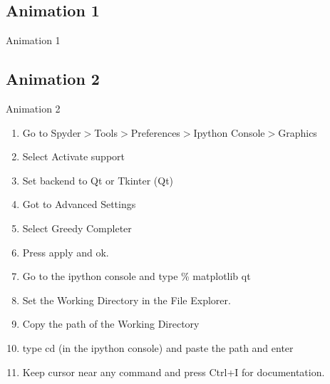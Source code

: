 \documentclass[handout]{beamer} %
\begin{document}
\subsection{Animation 1}
\begin{frame}{Animation 1}
	\only<2>{second}
	
	 \onslide<4>{fourth}
\end{frame}

\subsection{Animation 2}
\begin{frame}{Animation 2}
	\begin{enumerate}
		\item <+-|alert@+> Go to Spyder$>$Tools$>$Preferences$>$Ipython Console$>$Graphics
		\item  <+-|alert@+> Select Activate support
		\item  <+-|alert@+> {\color{red} Set backend to Qt or Tkinter (Qt)}
		\item  <+-|alert@+> Got to Advanced Settings
		\item  <+-|alert@+> Select Greedy Completer
		\item  <+-|alert@+> Press apply and ok.
		\item  <+-> Go to the ipython console and type \% matplotlib qt
		\item  <+-> Set the Working Directory in the File Explorer.
		\item  <+-> Copy the path of the Working Directory
		\item  <+-> type cd (in the ipython console) and paste the path and enter
		\item <+->  Keep cursor near any command and press Ctrl+I for documentation.
	\end{enumerate}
\end{frame}
\end{document}
